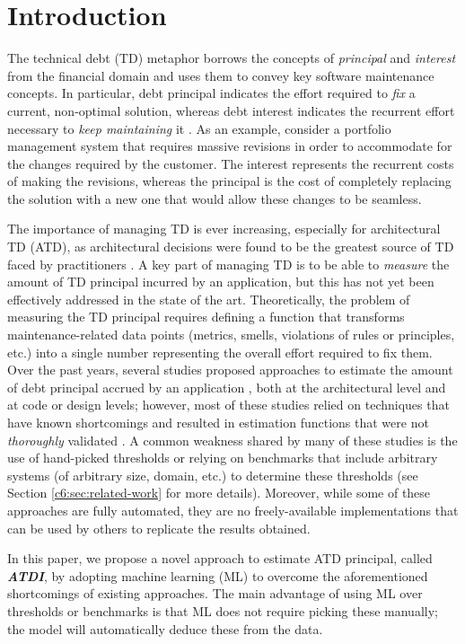 \section{Introduction}\label{c6:sec:Intro}
The technical debt (TD) metaphor borrows the concepts of \emph{principal} and \emph{interest} from the financial domain and uses them to convey key software maintenance concepts.
In particular, debt principal indicates the effort required to \emph{fix} a current, non-optimal solution, whereas debt interest indicates the recurrent effort necessary to \emph{keep maintaining} it \cite{Avgeriou2016}.
As an example, consider a portfolio management system that requires massive revisions in order to accommodate for the changes required by the customer\cite{Cunningham1992}. The interest represents the recurrent costs of making the revisions, whereas the principal is the cost of completely replacing the solution with a new one that would allow these changes to be seamless.

The importance of managing TD is ever increasing, especially for architectural TD (ATD), as architectural decisions were found to be the greatest source of TD faced by practitioners \cite{Ernst2015}.
A key part of managing TD is to be able to \emph{measure} the amount of TD principal incurred by an application, but this has not yet been effectively addressed in the state of the art.
Theoretically, the problem of measuring the TD principal requires defining a function that transforms maintenance-related data points (metrics, smells, violations of rules or principles, etc.) into a single number representing the overall effort required to fix them.
Over the past years, several studies proposed approaches to estimate the amount of debt principal accrued by an application \cite{Khomyakov2020,Avgeriou2021}, both at the architectural level and at code or design levels; however, most of these studies relied on techniques that have known shortcomings and resulted in estimation functions that were not \emph{thoroughly} validated \cite{Khomyakov2020}.
A common weakness shared by many of these studies is the use of hand-picked thresholds or relying on benchmarks that include arbitrary systems (of arbitrary size, domain, etc.) to determine these thresholds (see Section \ref{c6:sec:related-work} for more details).
Moreover, while some of these approaches are fully automated, they are no freely-available implementations that can be used by others to replicate the results obtained.

In this paper, we propose a novel approach to estimate ATD principal, called \textbf{\emph{ATDI}}, by adopting machine learning (ML) to overcome the aforementioned shortcomings of existing approaches.
The main advantage of using ML over thresholds or benchmarks is that ML does not require picking these manually; the model will automatically deduce these from the data.

